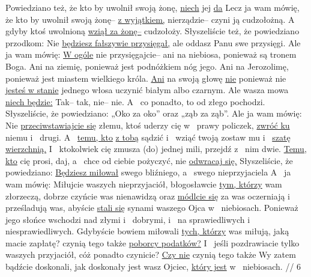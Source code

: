  Powiedziano też, że kto by uwolnił swoją żonę, \underline{niech} jej \underline{da} 
 Lecz ja wam mówię, że kto by uwolnił swoją żonę– \underline{z wyjątkiem,}  nierządzie– czyni ją cudzołożną. A~ gdyby ktoś uwolnioną \underline{wziął za żonę–} cudzołoży.
 Słyszeliście też, że powiedziano przodkom: Nie \underline{będziesz fałszywie przysięgał,} ale oddasz Panu swe przysięgi.
 Ale ja wam mówię: \underline{W ogóle} nie przysięgajcie– ani na niebiosa, ponieważ są tronem Boga.
 Ani na ziemię, ponieważ jest podnóżkiem nóg jego. Ani na Jerozolimę, ponieważ jest miastem wielkiego króla.
 \underline{Ani} na swoją głowę \underline{nie}  ponieważ nie \underline{jesteś w stanie} jednego włosa uczynić białym albo czarnym.
 Ale wasza mowa \underline{niech będzie:} Tak– tak, nie– nie. A~ co ponadto, to od złego pochodzi.
 Słyszeliście, że powiedziano: „Oko za oko” oraz „ząb za ząb”.
 Ale ja wam mówię: Nie \underline{przeciwstawiajcie się} złemu,  ktoś uderzy cię w~ prawy policzek, \underline{zwróć ku} niemu i~ drugi.
 A~ \underline{temu, kto}  \underline{z tobą} sądzić i~ wziąć twoją  zostaw mu i~ \underline{szatę wierzchnią.}
 I~ ktokolwiek cię zmusza (do) jednej mili, przejdź z~ nim dwie.
 \underline{Temu, kto} cię prosi, daj, a~  chce od ciebie pożyczyć, nie \underline{odwracaj się.}
 Słyszeliście, że powiedziano: \underline{Będziesz miłował} swego bliźniego, a~ swego nieprzyjaciela 
 A~ ja wam mówię: Miłujcie waszych nieprzyjaciół, błogosławcie \underline{tym, którzy} wam złorzeczą, dobrze czyńcie  was nienawidzą oraz \underline{módlcie się} za  was oczerniają i~ prześladują was,
 abyście \underline{stali się} synami waszego Ojca w~ niebiosach. Ponieważ jego słońce wschodzi nad złymi i~ dobrymi, i~  na sprawiedliwych i~ niesprawiedliwych.
 Gdybyście bowiem miłowali \underline{tych, którzy} was miłują, jaką macie zapłatę?  czynią tego także \underline{poborcy podatków?}
 I~ jeśli pozdrawiacie tylko waszych przyjaciół, cóż ponadto czynicie? \underline{Czy nie} czynią tego także 
 Wy zatem bądźcie doskonali, jak doskonały jest wasz Ojciec, \underline{który jest} w~ niebiosach.
//
\endgl
\begingl
\lettrine[loversize=1,lraise=-1.3]{6 }{}%
